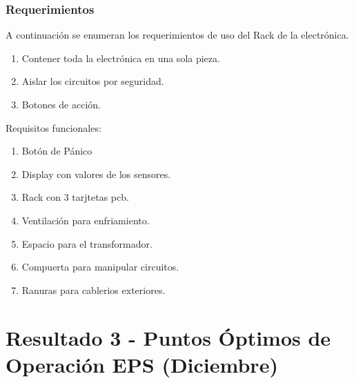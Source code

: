 \documentclass[12pt,twoside,onecolumn]{article}
\begin{document}
\subsubsection{Requerimientos}
A continuación se enumeran los requerimientos de uso del Rack de la electrónica.
\begin{enumerate}
\item Contener toda la electrónica en una sola pieza.
\item Aislar los circuitos por seguridad.
\item Botones de acción.
\end{enumerate}

Requisitos funcionales:
\begin{enumerate}
\item Botón de Pánico
\item Display con valores de los sensores.
\item Rack con 3 tarjtetas pcb.
\item Ventilación para enfriamiento.
\item Espacio para el transformador.
\item Compuerta para manipular circuitos.
\item Ranuras para cablerios exteriores.
\end{enumerate}

\section{Resultado 3 - Puntos Óptimos de Operación EPS (Diciembre)} %

\newpage


{}
\end{document}
